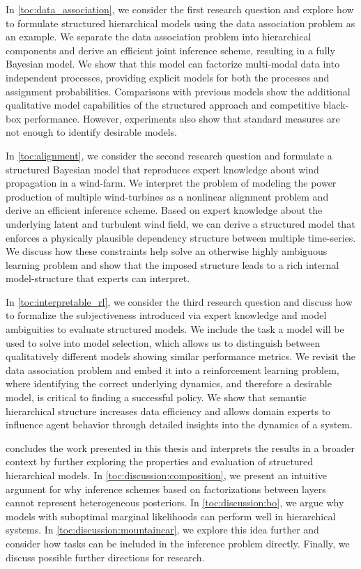 In \cref{toc:data_association}, we consider the first research question and explore how to formulate structured hierarchical models using the data association problem as an example.
We separate the data association problem into hierarchical components and derive an efficient joint inference scheme, resulting in a fully Bayesian model.
We show that this model can factorize multi-modal data into independent processes, providing explicit models for both the processes and assignment probabilities.
Comparisons with previous models show the additional qualitative model capabilities of the structured approach and competitive black-box performance.
However, experiments also show that standard measures are not enough to identify desirable models.

In \cref{toc:alignment}, we consider the second research question and formulate a structured Bayesian model that reproduces expert knowledge about wind propagation in a wind-farm.
We interpret the problem of modeling the power production of multiple wind-turbines as a nonlinear alignment problem and derive an efficient inference scheme.
Based on expert knowledge about the underlying latent and turbulent wind field, we can derive a structured model that enforces a physically plausible dependency structure between multiple time-series.
We discuss how these constraints help solve an otherwise highly ambiguous learning problem and show that the imposed structure leads to a rich internal model-structure that experts can interpret.

In \cref{toc:interpretable_rl}, we consider the third research question and discuss how to formalize the subjectiveness introduced via expert knowledge and model ambiguities to evaluate structured models.
We include the task a model will be used to solve into model selection, which allows us to distinguish between qualitatively different models showing similar performance metrics.
We revisit the data association problem and embed it into a reinforcement learning problem, where identifying the correct underlying dynamics, and therefore a desirable model, is critical to finding a successful policy.
We show that semantic hierarchical structure increases data efficiency and allows domain experts to influence agent behavior through detailed insights into the dynamics of a system.

 concludes the work presented in this thesis and interprets the results in a broader context by further exploring the properties and evaluation of structured hierarchical models.
In \cref{toc:discussion:composition}, we present an intuitive argument for why inference schemes based on factorizations between layers cannot represent heterogeneous posteriors.
In \cref{toc:discussion:bo}, we argue why models with suboptimal marginal likelihoods can perform well in hierarchical systems.
In \cref{toc:discussion:mountaincar}, we explore this idea further and consider how tasks can be included in the inference problem directly.
Finally, we discuss possible further directions for research.
